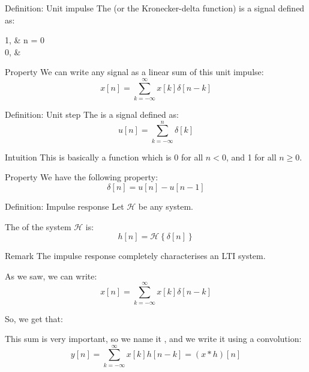 \documentclass[a4paper]{article}
\begin{document}
\begin{parag}{Definition: Unit impulse}
    The  (or the Kronecker-delta function) is a signal defined as:
    \begin{functionbypart}{\delta \left[n\right]}
        1, &  n = 0 \\
        0, & 
    \end{functionbypart} 

    \begin{subparag}{Property}
        We can write any signal as a linear sum of this unit impulse: 
        \[x\left[n\right] = \sum_{k=-\infty}^{\infty} x\left[k\right] \delta \left[n-k\right]\]
    \end{subparag}
\end{parag}

\begin{parag}{Definition: Unit step}
    The  is a signal defined as: 
    \[u\left[n\right] = \sum_{k=-\infty}^{n} \delta \left[k\right]\]
    
    \begin{subparag}{Intuition}
        This is basically a function which is 0 for all $n < 0$, and 1 for all $n \geq 0$.

    \end{subparag}

    \begin{subparag}{Property}
        We have the following property: 
        \[\delta \left[n\right] = u\left[n\right] - u\left[n-1\right]\]
    \end{subparag}
\end{parag}


\begin{parag}{Definition: Impulse response}
    Let $\mathcal{H}$ be any system.

    The  of the system $\mathcal{H}$ is:
    \[h\left[n\right] = \mathcal{H}\left\{\delta \left[n\right]\right\}\]

    \begin{subparag}{Remark}
        The impulse response completely characterises an LTI system.

        As we saw, we can write:
        \[x\left[n\right] = \sum_{k=-\infty}^{\infty} x\left[k\right] \delta \left[n-k\right]\]

         So, we get that: 

         This sum is very important, so we name it , and we write it using a convolution:
         \[y\left[n\right] = \sum_{k=-\infty}^{\infty} x\left[k\right] h\left[n-k\right] = \left(x * h\right)\left[n\right]\]
    \end{subparag}
\end{parag}
\end{document}
